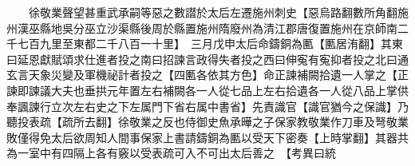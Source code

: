 　　徐敬業聲望甚重武承嗣等惡之數譛於太后左遷施州刺史【惡烏路翻數所角翻施州漢巫縣地吳分巫立沙渠縣後周於縣置施州隋廢州為清江郡唐復置施州在京師南二千七百九里至東都二千八百一十里】　三月戊申太后命鑄銅為匭【匭居洧翻】其東曰延恩獻賦頌求仕進者投之南曰招諫言政得失者投之西曰伸寃有寃抑者投之北曰通玄言天象災變及軍機祕計者投之【四匭各依其方色】命正諫補闕拾遺一人掌之【正諫即諫議大夫也垂拱元年置左右補闕各一人從七品上左右拾遺各一人從八品上掌供奉諷諫行立次左右史之下左属門下省右属中書省】先責識官【識官猶今之保識】乃聽投表疏【疏所去翻】徐敬業之反也侍御史魚承曄之子保家教敬業作刀車及弩敬業敗僅得免太后欲周知人間事保家上書請鑄銅為匭以受天下密奏【上時掌翻】其器共為一室中有四隔上各有竅以受表疏可入不可出太后善之　【考異曰統